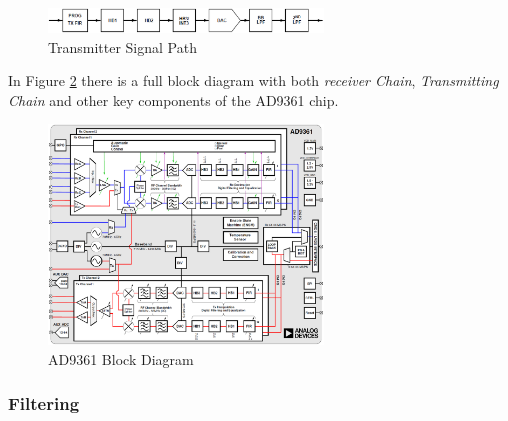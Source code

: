 \begin{figure}[htbp]
    \centering
    \includegraphics[width=0.65\textwidth]{./figures/tx_chain}
    \caption{ Transmitter Signal Path
    \label{fig:txchain}}
\end{figure}


%

In Figure \ref{fig:ad9361blk} there is a full block diagram with both
\textit{receiver Chain}, \textit{Transmitting Chain} and other key components of
the AD9361 chip.

\begin{figure}[htbp]
    \centering
    \includegraphics[width=0.65\textwidth]{./figures/ad9361_block_diagram}
    \caption{ AD9361 Block Diagram
    \label{fig:ad9361blk}}
\end{figure}

\subsubsection{Filtering}

